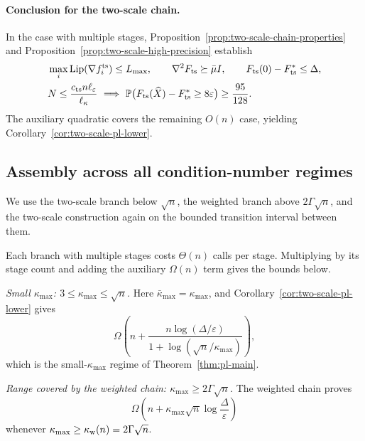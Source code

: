 \documentclass{article}
\theoremstyle{definition}
\newcommand{\Prob}{\mathbb{P}}
\begin{document}
\paragraph{Conclusion for the two-scale chain.}
In the case with multiple stages, Proposition~\ref{prop:two-scale-chain-properties} and
Proposition~\ref{prop:two-scale-high-precision} establish
\begin{equation*}
\begin{aligned}
 &\max_i\operatorname{Lip}(\nabla f_i^{\rm ts})\le L_{\max},
 \qquad \nabla^2F_{\rm ts}\succeq\bar\mu I,
 \qquad F_{\rm ts}(0)-F_{\rm ts}^*\le\Delta,\\
 &N\le\frac{c_{\rm ts}n\ell_\varepsilon}{\ell_\kappa}
 \ \Longrightarrow\ 
 \Prob\bigl(F_{\rm ts}(\widehat X)-F_{\rm ts}^*\ge8\varepsilon\bigr)
 \ge\frac{95}{128}.
\end{aligned}
\end{equation*}
The auxiliary quadratic covers the remaining $O(n)$ case, yielding
Corollary~\ref{cor:two-scale-pl-lower}.

\subsection*{Assembly across all condition-number regimes}

We use the two-scale branch below $\sqrt n$, the weighted branch above
$2\Gamma\sqrt n$, and the two-scale construction again on the bounded
transition interval between them.

Each branch with multiple stages costs $\Theta(n)$ calls per stage.  Multiplying by its
stage count and adding the auxiliary $\Omega(n)$ term gives the bounds below.

\emph{Small $\kappa_{\max}$: $3\le\kappa_{\max}\le\sqrt n$.}
Here $\bar\kappa_{\max}=\kappa_{\max}$, and
Corollary~\ref{cor:two-scale-pl-lower} gives
\begin{equation}
 \Omega\!\left(
 n+\frac{n\log(\Delta/\varepsilon)}
 {1+\log(\sqrt n/\kappa_{\max})}
 \right),
 \label{eq:restated-two-scale-small-regime}
\end{equation}
which is the small-$\kappa_{\max}$ regime of Theorem~\ref{thm:pl-main}.

\emph{Range covered by the weighted chain: $\kappa_{\max}\ge2\Gamma\sqrt n$.}
The weighted chain proves
\begin{equation}
 \Omega\!\left(
 n+\kappa_{\max}\sqrt n\log\frac{\Delta}{\varepsilon}
 \right)
 \label{eq:weighted-large-branch}
\end{equation}
whenever $\kappa_{\max}\ge\kappa_{\rm w}(n)=2\Gamma\sqrt n$.
\end{document}
